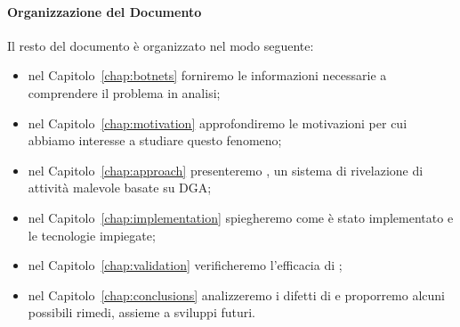 \paragraph{Organizzazione del Documento}
Il resto del documento è organizzato nel modo seguente:
\begin{itemize}
    \item nel Capitolo~\ref{chap:botnets} forniremo le informazioni necessarie a comprendere il problema in analisi;
    \item nel Capitolo~\ref{chap:motivation} approfondiremo le motivazioni per cui
        abbiamo interesse a studiare questo fenomeno;
    \item nel Capitolo~\ref{chap:approach} presenteremo \thesystem, un
        sistema di rivelazione di attività malevole basate su DGA;
    \item nel Capitolo~\ref{chap:implementation} spiegheremo come \thesystem
        è stato implementato e le tecnologie impiegate;
    \item nel Capitolo~\ref{chap:validation} verificheremo l'efficacia di
    \thesystem;
    \item nel Capitolo~\ref{chap:conclusions} analizzeremo i difetti di
    \thesystem e proporremo alcuni possibili rimedi, assieme a sviluppi futuri.
\end{itemize}

